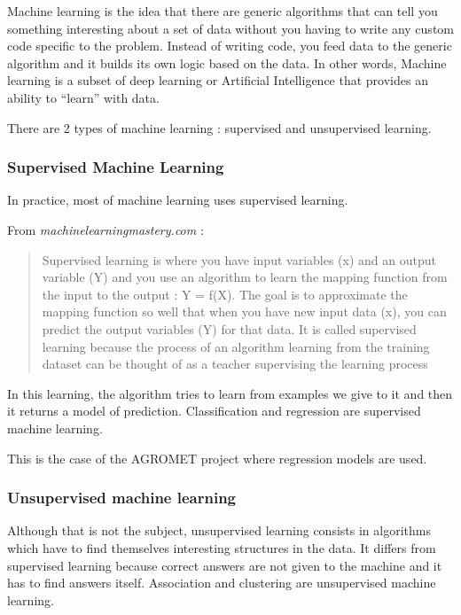 \documentclass[12pt,twoside]{reedthesis}
\theoremstyle{definition}
\theoremstyle{definition}
\theoremstyle{definition}
\theoremstyle{remark}
\begin{document}
Machine learning is the idea that there are generic algorithms that can
tell you something interesting about a set of data without you having to
write any custom code specific to the problem. Instead of writing code,
you feed data to the generic algorithm and it builds its own logic based
on the data. In other words, Machine learning is a subset of deep
learning or Artificial Intelligence that provides an ability to
``learn'' with data.

There are 2 types of machine learning : supervised and unsupervised
learning.

\subsubsection{Supervised Machine
Learning}\label{supervised-machine-learning}

In practice, most of machine learning uses supervised learning.

From \emph{machinelearningmastery.com} :
\begin{quote}
Supervised learning is where you have input variables (x) and an output
variable (Y) and you use an algorithm to learn the mapping function from
the input to the output : Y = f(X). The goal is to approximate the
mapping function so well that when you have new input data (x), you can
predict the output variables (Y) for that data. It is called supervised
learning because the process of an algorithm learning from the training
dataset can be thought of as a teacher supervising the learning process
\end{quote}
In this learning, the algorithm tries to learn from examples we give to
it and then it returns a model of prediction. Classification and
regression are supervised machine learning.

This is the case of the AGROMET project where regression models are
used.

\subsubsection{Unsupervised machine
learning}\label{unsupervised-machine-learning}

Although that is not the subject, unsupervised learning consists in
algorithms which have to find themselves interesting structures in the
data. It differs from supervised learning because correct answers are
not given to the machine and it has to find answers itself. Association
and clustering are unsupervised machine learning.
\end{document}
